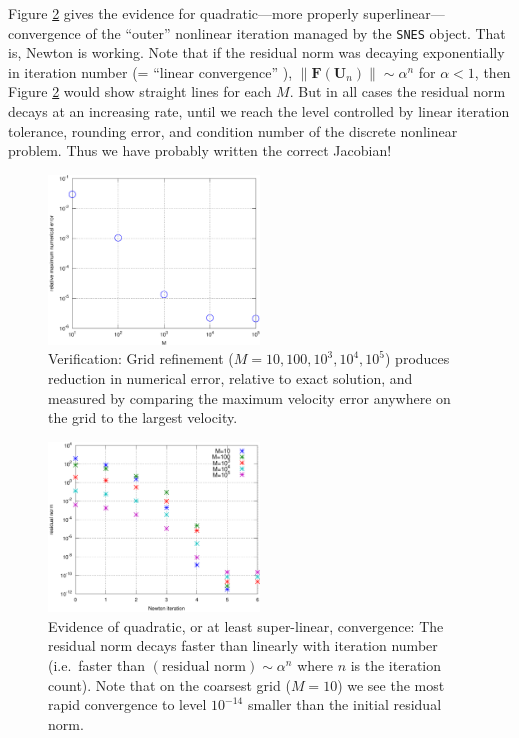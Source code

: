 \documentclass[11pt,final,reqno]{amsart}
\newcommand{\bbF}{\mathbf{F}}
\newcommand{\bU}{\mathbf{U}}
\begin{document}
Figure \ref{fig:quadconv} gives the evidence for quadratic---more properly superlinear---convergence of the ``outer'' nonlinear iteration managed by the \texttt{SNES} object.  That is, Newton is working.  Note that if the residual norm was decaying exponentially in iteration number (= ``linear convergence'' \cite{BurdenFaires}), $\|\bbF(\bU_n)\| \sim \alpha^n$ for $\alpha < 1$, then Figure \ref{fig:quadconv} would show straight lines for each $M$.  But in all cases the residual norm decays at an increasing rate, until we reach the level controlled by linear iteration tolerance, rounding error, and condition number of the discrete nonlinear problem.  Thus we have probably written the correct Jacobian!

\begin{figure}[ht] 
\begin{center}
\includegraphics[width=0.5\textwidth]{numerr}
\end{center}
\caption{Verification:  Grid refinement ($M=10,100,10^3,10^4,10^5$) produces reduction in numerical error, relative to exact solution, and measured by comparing the maximum velocity error anywhere on the grid to the largest velocity.}
\label{fig:numerr}
\end{figure}

\begin{figure}[ht] 
\begin{center}
\includegraphics[width=0.5\textwidth]{quadconv}
\end{center}
\caption{Evidence of quadratic, or at least super-linear, convergence:  The residual norm decays faster than linearly with iteration number (i.e.~faster than $(\text{residual norm})\sim \alpha^n$ where $n$ is the iteration count).  Note that on the coarsest grid ($M=10$) we see the most rapid convergence to level $10^{-14}$ smaller than the initial residual norm.}
\label{fig:quadconv}
\end{figure}
\end{document}
